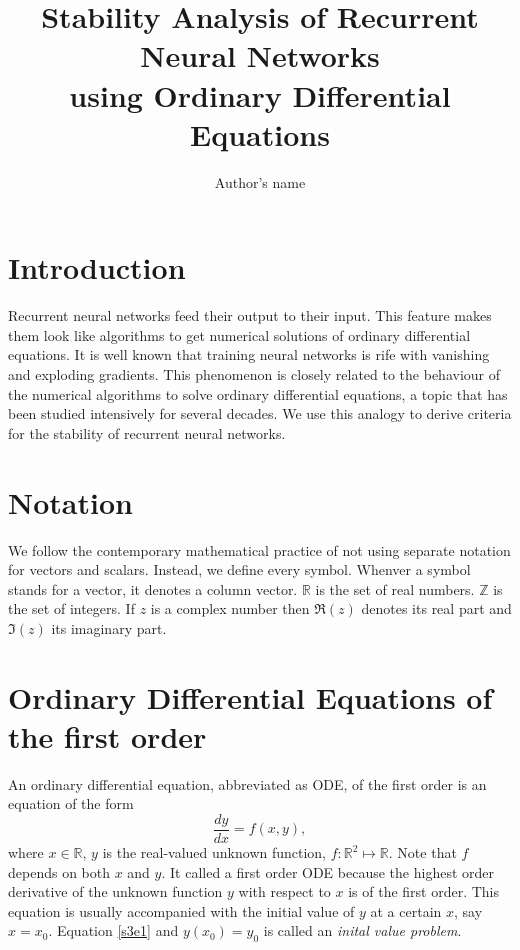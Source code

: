 \documentclass{article}
\numberwithin{equation}{section}
\begin{document}
\title{Stability Analysis of Recurrent Neural Networks \\
    using Ordinary Differential Equations}
\author{Author's name}
\maketitle
\section{Introduction}\label{s1}
Recurrent neural networks feed their output to their input. This feature
makes them look like algorithms to get numerical solutions of ordinary
differential equations. It is well known that training neural networks is
rife with vanishing and exploding gradients\cite{gereon2018hands}. This
phenomenon is closely related to the behaviour of the numerical algorithms
to solve ordinary differential equations, a topic that has been studied
intensively for several decades. We use this analogy to derive criteria for
the stability of recurrent neural networks.

\section{Notation}\label{s2}
We follow the contemporary mathematical practice of not using separate
notation for vectors and scalars. Instead, we define every symbol. Whenver
a symbol stands for a vector, it denotes a column vector. $\mathbb{R}$ is 
the set of real numbers. $\mathbb{Z}$ is the set of integers. If $z$ is
a complex number then $\Re(z)$ denotes its real part and $\Im(z)$ its
imaginary part.

\section{Ordinary Differential Equations of the first order}\label{s3}
An ordinary differential equation, abbreviated as ODE, of the first order 
is an equation of the form
\begin{equation}\label{s3e1}
\frac{dy}{dx} = f(x, y),
\end{equation}
where $x \in \mathbb{R}$, $y$ is the real-valued unknown function, $f: 
\mathbb{R}^2 \mapsto \mathbb{R}$. Note that $f$ depends on both $x$ and 
$y$. It called a first order ODE because the highest order derivative
of the unknown function $y$ with respect to $x$ is of the first order.
This equation is usually accompanied with the initial value of $y$ at a 
certain $x$, say $x = x_0$. Equation \eqref{s3e1} and $y(x_0) = y_0$ is
called an \emph{inital value problem}.
\end{document}
